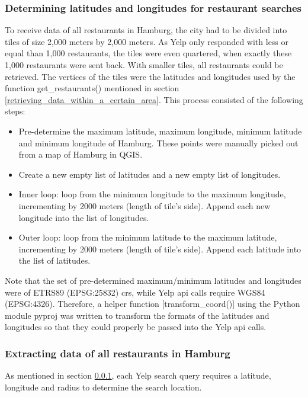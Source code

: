\documentclass[a4paper, 11pt, oneside]{Thesis}  %
\begin{document}
\subsubsection{Determining latitudes and longitudes for restaurant searches}
\label{Determining_latitudes_and_longitudes_for_restaurant_searches}

To receive data of all restaurants in Hamburg, the city had to be divided into tiles of size 2,000 meters by 2,000 meters. As Yelp only responded with less or equal than 1,000 restaurants, the tiles were even quartered, when exactly these 1,000 restaurants were sent back. With smaller tiles, all restaurants could be retrieved. The vertices of the tiles were the latitudes and longitudes used by the function get\_restaurants() mentioned in section \ref{retrieving_data_within_a_certain_area}. This process consisted of the following steps:
\begin{itemize}
\item Pre-determine the maximum latitude, maximum longitude, minimum latitude and minimum longitude of Hamburg. These points were manually picked out from a map of Hamburg in QGIS.
\item Create a new empty list of latitudes and a new empty list of longitudes.
\item Inner loop: loop from the minimum longitude to the maximum longitude, incrementing by 2000 meters (length of tile’s side). Append each new longitude into the list of longitudes.
\item Outer loop: loop from the minimum latitude to the maximum latitude, incrementing by 2000 meters (length of tile’s side). Append each latitude into the list of latitudes.
\end{itemize}

Note that the set of pre-determined maximum/minimum latitudes and longitudes were of ETRS89 (EPSG:25832) \ac{crs}, while Yelp \ac{api} calls require WGS84 (EPSG:4326). Therefore, a helper function [transform\_coord()] using the Python module pyproj \cite{JeffWhitaker.2018} was written to transform the formats of the latitudes and longitudes so that they could properly be passed into the Yelp \ac{api} calls.

\subsubsection{Extracting data of all restaurants in Hamburg}
\label{Extracting data of all restaurants in Hamburg}
As mentioned in section \ref{Determining_latitudes_and_longitudes_for_restaurant_searches}, each Yelp search query requires a latitude, longitude and radius to determine the search location.
\end{document}
